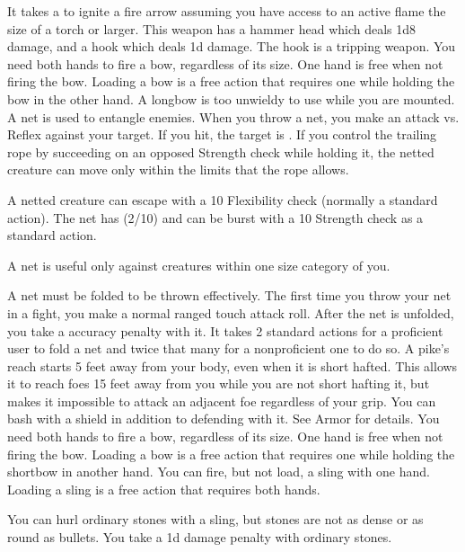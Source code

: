         It takes a  to ignite a fire arrow assuming you have access to an active flame the size of a torch or larger.
         This weapon has a hammer head which deals 1d8 damage, and a hook which deals \minus1d damage. The hook is a tripping weapon.
         You need both hands to fire a bow, regardless of its size. One hand is free when not firing the bow. Loading a bow is a free action that requires one  while holding the bow in the other hand. A longbow is too unwieldy to use while you are mounted.
         A net is used to entangle enemies. When you throw a net, you make an attack vs. Reflex against your target. If you hit, the target is \slowed. If you control the trailing rope by succeeding on an opposed Strength check while holding it, the netted creature can move only within the limits that the rope allows.
        \par A netted creature can escape with a  10 Flexibility check (normally a standard action). The net has (2/10) and can be burst with a  10 Strength check as a standard action.
        \par A net is useful only against creatures within one size category of you.
        \par A net must be folded to be thrown effectively. The first time you throw your net in a fight, you make a normal ranged touch attack roll. After the net is unfolded, you take a  accuracy penalty with it. It takes 2 standard actions for a proficient user to fold a net and twice that many for a nonproficient one to do so.
         A pike's reach starts 5 feet away from your body, even when it is short hafted.
        This allows it to reach foes 15 feet away from you while you are not short hafting it, but makes it impossible to attack an adjacent foe regardless of your grip.
         You can bash with a shield in addition to defending with it. See Armor for details.
         You need both hands to fire a bow, regardless of its size. One hand is free when not firing the bow. Loading a bow is a free action that requires one  while holding the shortbow in another hand.
         You can fire, but not load, a sling with one hand. Loading a sling is a free action that requires both hands.
        \par You can hurl ordinary stones with a sling, but stones are not as dense or as round as bullets. You take a \minus1d damage penalty with ordinary stones.

